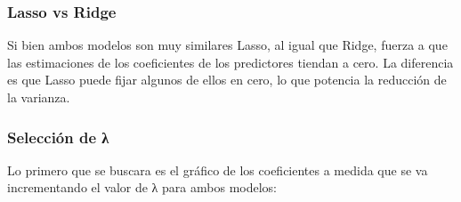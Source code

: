 \subsubsection{Lasso vs Ridge}

Si bien ambos modelos son muy similares Lasso, al igual que Ridge, fuerza a que las estimaciones de los coeficientes de los predictores tiendan a cero. La diferencia es que Lasso puede fijar algunos de ellos en cero, lo que potencia la reducción de la varianza.

\subsubsection{Selección de λ}

Lo primero que se buscara es el gráfico de los coeficientes a medida que se va incrementando el valor de λ para ambos modelos:


